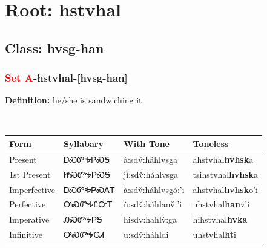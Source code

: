 \needspace{4in}
\section*{Root: hstvhal}
\nopagebreak
{}
\needspace{3in}
\subsection*{Class: hvsg-han}
\nopagebreak
\needspace{2in}
\subsubsection*{\textcolor{Red}{Set A}{-}\textbf{hstvhal}{-}[hvsg-han]}
\nopagebreak
\textbf{Definition: } he/she is sandwiching it
\\[0.5em]
\begin{tabularx}{\textwidth}{l X X X}%
\toprule%
\textbf{Form}&\textbf{Syllabary}&\textbf{With Tone}&\textbf{Toneless}\\%
\midrule%
Present&ᎠᏍᏛᎭᏢᏍᎦ&à:sdv̌:háhlvsga&ahstvhal\textbf{hvhsk}a\\%
1st Present&ᏥᏍᏛᎭᏢᏍᎦ&jì:sdv̌:háhlvsga&tsihstvhal\textbf{hvhsk}a\\%
Imperfective&ᎠᏍᏛᎭᏢᏍᎪᎢ&à:sdv̌:háhlvsgó:’i&ahstvhal\textbf{hvhsk}o'i\\%
Perfective&ᎤᏍᏛᎭᏝᏅᎢ&ù:sdv̌:háhlanv̌:’i&uhstvhal\textbf{han}v'i\\%
Imperative&ᎯᏍᏛᎭᏢᎦ&hisdv:hahlv̀:ga&hihstvhal\textbf{hvka}\\%
Infinitive&ᎤᏍᏛᎭᏟᏗ&u:sdv̌:háhldi&uhstvhal\textbf{ht}i\\%
\bottomrule%
\end{tabularx}
\\[1em]